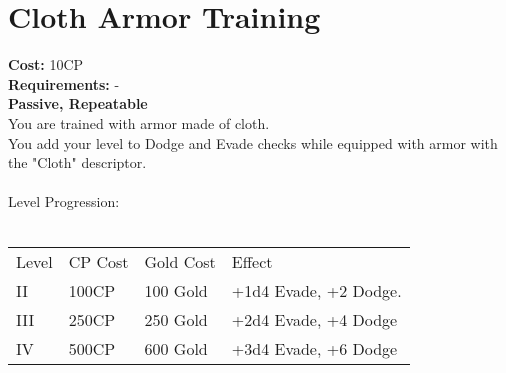 \section{Cloth Armor Training}\label{perk:clothArmorTraining}
\textbf{Cost:} 10CP\\
\textbf{Requirements:} -\\
\textbf{Passive, Repeatable}\\
You are trained with armor made of cloth.\\
You add your level to Dodge and Evade checks while equipped with armor with the "Cloth" descriptor.\\
\\

Level Progression:\\
\\
\begin{tabular}{l | l | l | l}
	Level & CP Cost & Gold Cost & Effect\\
	II & 100CP & 100 Gold & +1d4 Evade, +2 Dodge.\\
	III & 250CP & 250 Gold & +2d4 Evade, +4 Dodge\\
	IV & 500CP & 600 Gold & +3d4 Evade, +6 Dodge\\
\end{tabular}